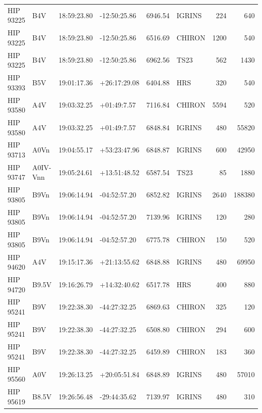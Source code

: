 \documentclass{emulateapj}
\begin{document}
\begin{longtable*}{|l|lllrlrr|}
   HIP 93225 &            B4V &    18:59:23.80 &   -12:50:25.86 &  6946.54 &     IGRINS &      224 &     640 \\
   HIP 93225 &            B4V &    18:59:23.80 &   -12:50:25.86 &  6516.69 &     CHIRON &     1200 &     540 \\
   HIP 93225 &            B4V &    18:59:23.80 &   -12:50:25.86 &  6962.56 &       TS23 &      562 &    1430 \\
   HIP 93393 &            B5V &    19:01:17.36 &   +26:17:29.08 &  6404.88 &        HRS &      320 &     540 \\
   HIP 93580 &            A4V &    19:03:32.25 &    +01:49:7.57 &  7116.84 &     CHIRON &     5594 &     520 \\
   HIP 93580 &            A4V &    19:03:32.25 &    +01:49:7.57 &  6848.84 &     IGRINS &      480 &   55820 \\
   HIP 93713 &           A0Vn &    19:04:55.17 &   +53:23:47.96 &  6848.87 &     IGRINS &      600 &   42950 \\
   HIP 93747 &       A0IV-Vnn &    19:05:24.61 &   +13:51:48.52 &  6587.54 &       TS23 &       85 &    1880 \\
   HIP 93805 &           B9Vn &    19:06:14.94 &   -04:52:57.20 &  6852.82 &     IGRINS &     2640 &  188380 \\
   HIP 93805 &           B9Vn &    19:06:14.94 &   -04:52:57.20 &  7139.96 &     IGRINS &      120 &     280 \\
   HIP 93805 &           B9Vn &    19:06:14.94 &   -04:52:57.20 &  6775.78 &     CHIRON &      150 &     520 \\
   HIP 94620 &            A4V &    19:15:17.36 &   +21:13:55.62 &  6848.88 &     IGRINS &      480 &   69950 \\
   HIP 94720 &          B9.5V &    19:16:26.79 &   +14:32:40.62 &  6517.78 &        HRS &      400 &     880 \\
   HIP 95241 &            B9V &    19:22:38.30 &   -44:27:32.25 &  6869.63 &     CHIRON &      325 &     120 \\
   HIP 95241 &            B9V &    19:22:38.30 &   -44:27:32.25 &  6508.80 &     CHIRON &      294 &     600 \\
   HIP 95241 &            B9V &    19:22:38.30 &   -44:27:32.25 &  6459.89 &     CHIRON &      183 &     360 \\
   HIP 95560 &            A0V &    19:26:13.25 &   +20:05:51.84 &  6848.89 &     IGRINS &      480 &   57010 \\
   HIP 95619 &          B8.5V &    19:26:56.48 &   -29:44:35.62 &  7139.97 &     IGRINS &      480 &     310 \\

\end{longtable*}
\end{document}
